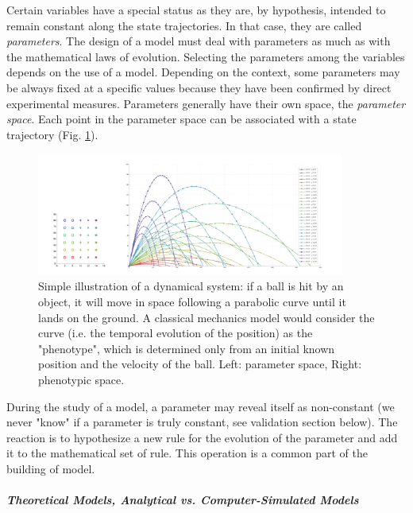 Certain variables have a special status as they are, by hypothesis, intended to remain constant along the state trajectories. In that case, they are called \textit{parameters}. The design of a model must deal with parameters as much as with the mathematical laws of evolution. Selecting the parameters among the variables depends on the use of a model. Depending on the context, some parameters may be always fixed at a specific values because they have been confirmed by direct experimental measures. Parameters generally have their own space, the \textit{parameter space}. Each point in the parameter space can be associated with a state trajectory (Fig. \ref{experimental_science_multi_initialstate}).
\begin{figure}
\begin{center}
\includegraphics[width=0.9\textwidth]{../../images/experimental_science/multi_initialstate_fusion.png}
\end{center}
\caption{Simple illustration of a dynamical system: if a ball is hit by an object, it will move in space following a parabolic curve until it lands on the ground. A classical mechanics model would consider the curve (i.e. the temporal evolution of the position) as the "phenotype", which is determined only from an initial known position and the velocity of the ball. Left: parameter space, Right: phenotypic space.}
\label{experimental_science_multi_initialstate}
\end{figure}

During the study of a model, a parameter may reveal itself as non-constant (we never "know" if a parameter is truly constant, see validation section below). The reaction is to hypothesize a new rule for the evolution of the parameter and add it to the mathematical set of rule. This operation is a common part of the building of model.

\subparagraph{Theoretical Models, Analytical vs. Computer-Simulated Models}


